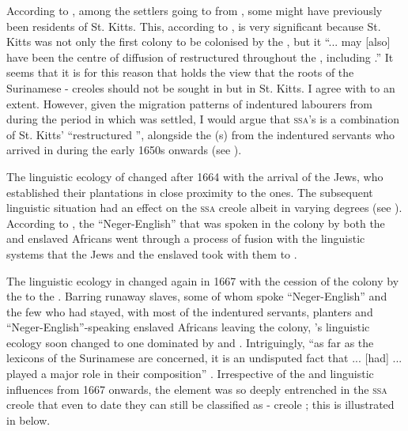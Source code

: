 According to \citet{Rens53}, among the settlers going to  from , some might have previously been residents of St. Kitts. This, according to \citet[117]{Arends02}, is very significant because St. Kitts was not only the first colony to be colonised by the , but it ``... may [also] have been the centre of diffusion of restructured  throughout the , including .'' It seems that it is for this reason that \citet{Arends02} holds the view that the  roots of the Surinamese - creoles should not be sought in  but in St. Kitts. I agree with \citet{Arends02} to an extent. However, given the migration patterns of indentured labourers from  during the period in which  was settled, I would argue that \textsc{ssa}'s   is a combination of St. Kitts'  ``restructured '', alongside the (s) from the indentured servants who arrived in  during the early 1650s onwards (see ).

The linguistic ecology of  changed after 1664 with the arrival of the  Jews, who established their plantations in close proximity to the  ones. The subsequent linguistic situation had an effect on the \textsc{ssa}  creole  albeit in varying degrees (see ). According to \citet{Rens53}, the ``Neger-English''  that was spoken in the colony by both the  and enslaved Africans went through a process of fusion with the  linguistic systems that the  Jews and the enslaved took with them to .

The linguistic ecology in  changed again in 1667 with the cession of the colony by the  to the . Barring runaway slaves, some of whom spoke ``Neger-English'' and the few  who had stayed, with most of the  indentured servants, planters and ``Neger-English''-speaking enslaved Africans leaving the colony, 's linguistic ecology soon changed to one dominated by  and . Intriguingly, ``as far as the lexicons of the Surinamese  are concerned, it is an undisputed fact that  ... [had] ... played a major role in their composition'' \citep[117]{Arends02}. Irrespective of the  and  linguistic influences from 1667 onwards, the  element was so deeply entrenched in the \textsc{ssa} creole  that even to date they can still be classified as - creole ; this is illustrated in  below.

